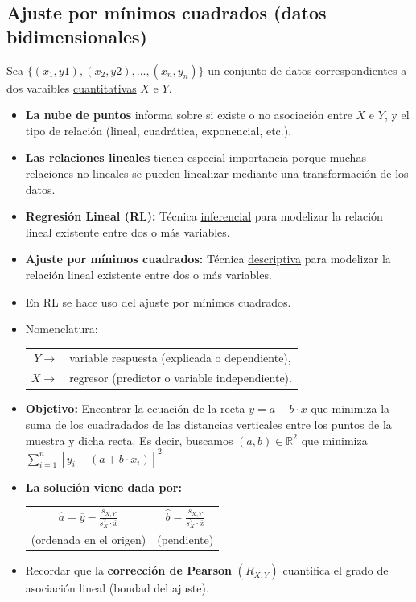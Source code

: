 \subsection{Ajuste por mínimos cuadrados (datos bidimensionales)}
Sea $\{(x_{1},y{1}), (x_{2},y{2}), \hdots, (x_{n},y_{n})\}$ un conjunto de datos correspondientes a dos varaibles \underline{cuantitativas} $X$ e $Y$.
\begin{itemize}
	\item \textbf{La nube de puntos} informa sobre si existe o no asociación entre $X$ e $Y$, y el tipo de relación (lineal, cuadrática, exponencial, etc.).
	\item \textbf{Las relaciones lineales} tienen especial importancia porque muchas relaciones no lineales se pueden linealizar mediante una transformación de los datos.
	\item \textbf{Regresión Lineal (RL):} Técnica \underline{inferencial} para modelizar la relación lineal existente entre dos o más variables.
	\item \textbf{Ajuste por mínimos cuadrados:} Técnica \underline{descriptiva} para modelizar la relación lineal existente entre dos o más variables.
	\item En RL se hace uso del ajuste por mínimos cuadrados.
	\item Nomenclatura:\begin{tabular}{rl}
		$Y \longrightarrow$ & variable respuesta (explicada o dependiente), \\
		$X \longrightarrow$ & regresor (predictor o variable independiente).
	\end{tabular}
	\item \textbf{Objetivo:} Encontrar la ecuación de la recta $y=a+b\cdot x$ que minimiza la suma de los cuadradados de las distancias verticales entre los puntos de la muestra y dicha recta. Es decir, buscamos $(a, b)\in \mathbb{R}^{2}$ que minimiza $\sum_{i=1}^{n}{[y_{i}-(a+b\cdot x_{i})]^{2}}$
	\item \textbf{La solución viene dada por:} \begin{center}
		\begin{tabular}{cc}
			$\hat{a}=\overline{y}-\frac{s_{X,Y}}{s_{X}^{2}\cdot \overline{x}}$ & $\hat{b}=\frac{s_{X,Y}}{s_{X}^{2}\cdot \overline{x}}$\\
			(ordenada en el origen) & (pendiente)
		\end{tabular}
	\end{center}
	\item Recordar que la \textbf{corrección de Pearson} $(R_{X, Y})$ cuantifica el grado de asociación lineal (bondad del ajuste).

\end{itemize}

